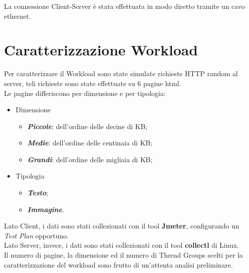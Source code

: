 La connessione Client-Server è stata effettuata in modo diretto tramite un
cavo ethernet.\\

\section{Caratterizzazione Workload}
Per caratterizzare il Workload sono state simulate richieste HTTP random al server,
teli richieste sono state effettuate su 6 pagine html.\\
Le pagine differiscono per dimensione e per tipologia:

\begin{itemize}
  \item Dimensione
  \begin{itemize}
    \item \textbf{\textit{Piccole}}: dell'ordine delle decine di KB;
    \item \textbf{\textit{Medie}}: dell'ordine delle centinaia di KB;
    \item \textbf{\textit{Grandi}}: dell'ordine delle migliaia di KB;
  \end{itemize}
  \item Tipologia
  \begin{itemize}
    \item \textbf{\textit{Testo}};
    \item \textbf{\textit{Immagine}}.
  \end{itemize}
\end{itemize}

Lato Client, i dati sono stati collezionati con il tool \textbf{Jmeter}, configurando
un \textit{Test Plan} opportuno.\\
Lato Server, invece, i dati sono stati collezionati con il tool \textbf{collectl}
di Linux.\\
Il numero di pagine, la dimensione ed il numero di Thread Groups scelti per la
caratterizzazione del workload sono frutto di un'attenta analisi preliminare.\\

